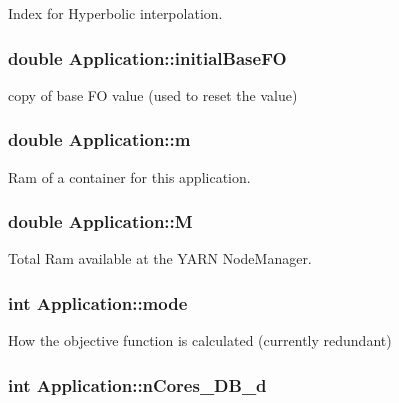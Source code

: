 Index for Hyperbolic interpolation. 

\hypertarget{classApplication_a95fd54cbed658fb23ce27939666c91d2}{
\subsubsection[{initial\-Base\-F\-O}]{\setlength{\rightskip}{0pt plus 5cm}double Application\-::initial\-Base\-F\-O}}\label{classApplication_a95fd54cbed658fb23ce27939666c91d2}


copy of base F\-O value (used to reset the value) 

\hypertarget{classApplication_ab903d83d3cde51569a27f97752c9f158}{
\subsubsection[{m}]{\setlength{\rightskip}{0pt plus 5cm}double Application\-::m}}\label{classApplication_ab903d83d3cde51569a27f97752c9f158}


Ram of a container for this application. 

\hypertarget{classApplication_a14904a2abf46cc0a50eb82043fa0912e}{
\subsubsection[{M}]{\setlength{\rightskip}{0pt plus 5cm}double Application\-::\-M}}\label{classApplication_a14904a2abf46cc0a50eb82043fa0912e}


Total Ram available at the Y\-A\-R\-N Node\-Manager. 

\hypertarget{classApplication_abc7e87e8cbe2e64fa4e2ff2afdf7a4fc}{
\subsubsection[{mode}]{\setlength{\rightskip}{0pt plus 5cm}int Application\-::mode}}\label{classApplication_abc7e87e8cbe2e64fa4e2ff2afdf7a4fc}


How the objective function is calculated (currently redundant) 

\hypertarget{classApplication_a95104d330c9c7ed2c1017b4938a39a9a}{
\subsubsection[{n\-Cores\-\_\-\-D\-B\-\_\-d}]{\setlength{\rightskip}{0pt plus 5cm}int Application\-::n\-Cores\-\_\-\-D\-B\-\_\-d}}\label{classApplication_a95104d330c9c7ed2c1017b4938a39a9a}


